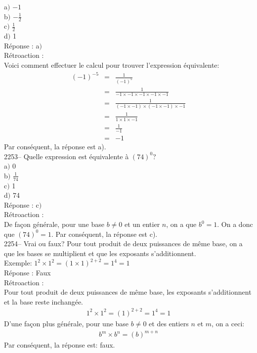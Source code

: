 \documentclass[letterpaper, 12pt]{article}
\begin{document}
a$)$ $-1$\\[2mm]
b$)$ $-\frac{1}{2}$\\[2mm]
c$)$ $\frac{1}{2}$\\[2mm]
d$)$ 1\\

R\'eponse : a$)$\\

R\'etroaction :\\
Voici comment effectuer le calcul pour trouver l'expression
\'equivalente:
\begin{eqnarray*}
(-1)^{-5}&=&\frac{1}{(-1)^{5}}\\[2mm]
&=&\frac{1}{-1\times-1\times-1\times-1\times-1}\\[2mm]
&=&\frac{1}{(-1\times-1)\times(-1\times-1)\times-1}\\[2mm]
&=&\frac{1}{1\times1\times-1}\\[2mm]
&=&\frac{1}{-1}\\[2mm]
&=&-1
\end{eqnarray*}
Par cons\'equent, la r\'eponse est a).\\

2253--  Quelle expression est \'equivalente \`a $(74)^{0}$?\\

a$)$ 0\\[2mm]
b$)$ $\frac{1}{74}$\\[2mm]
c$)$ 1\\[2mm]
d$)$ 74\\

R\'eponse : c$)$\\

R\'etroaction :\\
De fa\c con g\'en\'erale, pour une base $b\neq0$ et un entier $n$,
on a que $b^{0}=1$. On a donc que $(74)^{0}=1$.
Par cons\'equent, la r\'eponse est c).\\

2254-- Vrai ou faux? Pour tout produit de deux puissances de m\^eme base, on a que les bases se multiplient et que les exposants s'additionnent.\\

Exemple: $1^{2}\times 1^{2}=(1\times 1)^{2+2}=1^{4}=1$\\

R\'eponse : Faux\\

R\'etroaction :\\
Pour tout produit de deux puissances de m\^eme base, les exposants s'additionnent et la base reste inchang\'ee.
\begin{eqnarray*}
1^{2}\times 1^{2}=(1)^{2+2}=1^{4}=1
\end{eqnarray*}
D'une fa\c con plus g\'en\'erale, pour une base $b\neq0$ et des
entiers $n$ et $m$,  on a ceci:
\begin{eqnarray*}
b^{m}\times b^{n}=(b)^{m+n}
\end{eqnarray*}
Par cons\'equent, la r\'eponse est: faux.\\
\end{document}
